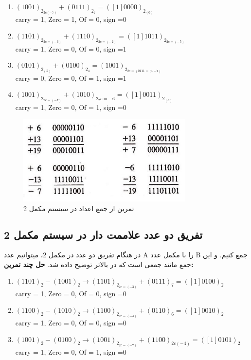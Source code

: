 \documentclass[pt, a5paper]{article}
\begin{document}
\begin{enumerate}\raggedright
	\item
	$(1001)_{2_{2c(-7)}} + (0111)_{2_{7}} = ([1] 0000)_{2_{(0)}}$\\
	carry = 1, Zero = 1, Of = 0, sign =0
	\item
	$(1101)_{2_{2c=(-3)}} + (1110)_{2_{2c=(-2)}} = ([1] 1011)_{2_{2c=(-5)}}$\\
	carry = 1, Zero = 0, Of = 0, sign =1
	
	\item
	$(0101)_{2_{(5)}} + (0100)_{2_{4}} = (1001)_{2_{2c=(0111 =>-7)}}$\\
	carry = 0, Zero = 0, Of = 1, sign =1

	\item
	$(1001)_{2_{2c=(-7)}} + (1010)_{2_2c={-6}} = ([1] 0011)_{2_{(3)}}$\\
	carry = 1, Zero = 0, Of = 1, sign =0
\end{enumerate}
\begin{figure}[htbp]
	\centerline{\includegraphics[width=250pt]{img/te1.jpg}}
	\caption{تمرین از جمع اعداد در سیستم مکمل 2}
	\label{fig}
\end{figure}

\subsection{تفریق دو عدد علاممت دار در سیستم مکمل 2}

در هنگام تفریق دو عدد در مکمل 2، میتوانیم عدد A را با مکمل عدد B جمع کنیم. و این جمع مانند جمعی است که در بالاتر توضیح داده شد.
\textbf{حل چند تمرین:}\\

\begin{enumerate}\raggedright
	\item
	$(1101)_{2} - (1001)_{2} \rightarrow (1101)_{2_{2c=(-3)}} + (0111)_{7} =([1] 0100)_{2} $\\
	carry = 1, Zero = 0, Of = 0, sign =0

	\item
	$(1100)_{2} - (1010)_{2} \rightarrow (1100)_{2_{2c=(-4)}} + (0110)_{6} =([1] 0010)_{2} $\\
	carry = 1, Zero = 0, Of = 0, sign =0
	
	\item
	$(1001)_{2} - (0100)_{2} \rightarrow (1001)_{2_{2c=(-7)}} + (1100)_{2c(-4)} =([1] 0101)_{2} $\\
	carry = 1, Zero = 0, Of = 1, sign =0

\end{enumerate}
\end{document}
